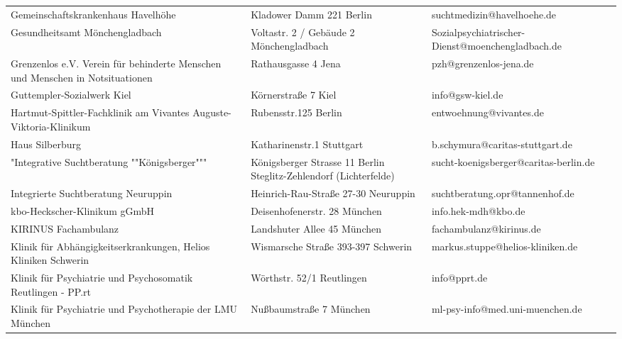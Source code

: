 {\begin{xltabular}{\textwidth} {
 >{\raggedright\arraybackslash}p{5cm}
 >{\raggedright\arraybackslash}X
 >{\raggedright\arraybackslash}p{5cm} }
Gemeinschaftskrankenhaus Havelhöhe & Kladower Damm 221 Berlin & suchtmedizin@havelhoehe.de \\
Gesundheitsamt Mönchengladbach & Voltastr. 2 / Gebäude 2 Mönchengladbach & Sozialpsychiatrischer-Dienst@moenchengladbach.de \\
Grenzenlos e.V. Verein für behinderte Menschen und Menschen in Notsituationen & Rathausgasse 4 Jena & pzh@grenzenlos-jena.de \\
Guttempler-Sozialwerk Kiel & Körnerstraße 7 Kiel & info@gsw-kiel.de \\
Hartmut-Spittler-Fachklinik am Vivantes Auguste-Viktoria-Klinikum & Rubensstr.125 Berlin & entwoehnung@vivantes.de \\
Haus Silberburg & Katharinenstr.1 Stuttgart & b.schymura@caritas-stuttgart.de \\
"Integrative Suchtberatung ""Königsberger""" & Königsberger Strasse 11 Berlin Steglitz-Zehlendorf (Lichterfelde) & sucht-koenigsberger@caritas-berlin.de \\
Integrierte Suchtberatung Neuruppin & Heinrich-Rau-Straße 27-30 Neuruppin & suchtberatung.opr@tannenhof.de \\
kbo-Heckscher-Klinikum gGmbH & Deisenhofenerstr. 28 München & info.hek-mdh@kbo.de \\
KIRINUS Fachambulanz & Landshuter Allee 45 München & fachambulanz@kirinus.de \\
Klinik für Abhängigkeitserkrankungen, Helios Kliniken Schwerin & Wismarsche Straße 393-397 Schwerin & markus.stuppe@helios-kliniken.de \\
Klinik für Psychiatrie und Psychosomatik Reutlingen - PP.rt & Wörthstr. 52/1 Reutlingen & info@pprt.de \\
Klinik für Psychiatrie und Psychotherapie der LMU München & Nußbaumstraße 7 München & ml-psy-info@med.uni-muenchen.de \\

\end{xltabular}}

